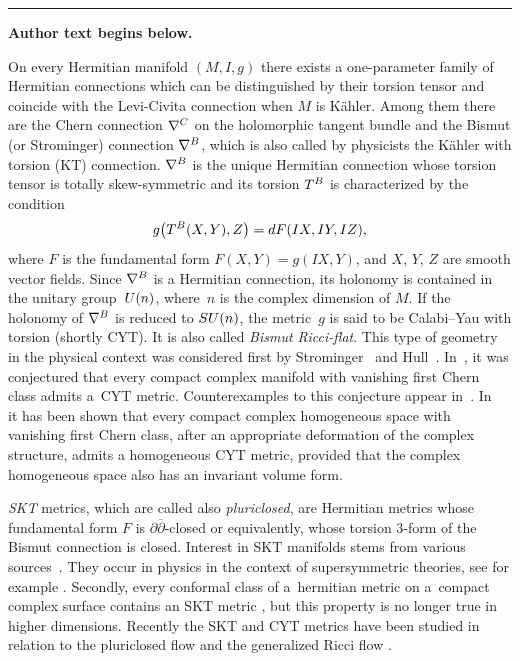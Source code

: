 \documentclass[11pt]{article}
\numberwithin{equation}{section}
\numberwithin{equation}{section}
\begin{document}
\medskip\hrule\medskip\noindent\textbf{Author text begins below.}\par
\setcounter{section}{1}
On every Hermitian manifold $(M, I, g)$ there exists a one-parameter family of Hermitian connections which can be distinguished by their torsion tensor and coincide with the Levi-Civita connection when $M$ is K\"ahler. Among them there are
the Chern connection $\nabla^{\rm C}$ on the holomorphic tangent bundle and the Bismut (or Strominger) connection $\nabla^{\rm B}$, which is also called by physicists the K\"ahler with torsion (KT) connection. $\nabla^{\rm B}$ is the unique Hermitian connection whose torsion tensor is totally skew-symmetric and its torsion $T^{\rm B}$ is characterized by the condition
\[
g \big(T^{\rm B}(X,Y), Z\big) = {\rm d}F(IX,IY,IZ),
\]
where $F$ is the fundamental form $F(X,Y) = g(IX,Y)$, and $X$, $Y$, $Z$ are smooth vector fields. Since $\nabla^{\rm B}$ is a Hermitian connection, its holonomy is contained in the unitary group~${\rm U}(n)$, where~$n$ is the complex dimension of $M$. If the holonomy of $\nabla^{\rm B}$ is reduced to ${\rm SU}(n)$, the metric~$g$
is said to be Calabi--Yau with torsion (shortly CYT). It is also called {\it Bismut Ricci-flat}.
This type of geometry in the physical context was considered first by Strominger~\cite{Strominger} and
Hull~\cite{Hull}. In~\cite{GIP}, it was conjectured that every compact complex manifold with vanishing first Chern class admits a~CYT metric. Counterexamples to this conjecture appear in~\cite{FG}. In~\cite{Grantcharov} it has been shown that every compact complex homogeneous space with vanishing first Chern class, after an appropriate deformation of the complex structure, admits a homogeneous CYT metric, provided that the complex homogeneous space also has an invariant volume form.

{\em SKT} metrics, which are called also {\em pluriclosed}, are Hermitian metrics whose fundamental form $F$ is $\partial \overline \partial$-closed or equivalently, whose torsion $3$-form of the Bismut connection is closed. Interest in SKT manifolds stems from various sources~\cite{Swann}. They occur in physics in the context of supersymmetric theories, see for example \cite{GHR,HP,Strominger}. Secondly, every conformal class of a~hermitian metric on a~compact complex surface contains an SKT metric \cite{Gau}, but this property is no longer true in higher dimensions. Recently the SKT and CYT metrics have been studied in relation to the pluriclosed flow and the generalized Ricci flow \cite{AFSU, Barbaro, GJS, GS}.
\end{document}
